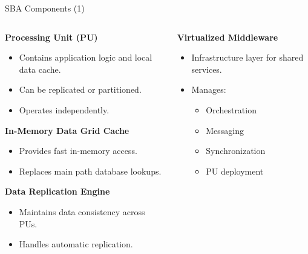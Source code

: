 \documentclass[aspectratio=169, table]{beamer}
\begin{document}
	\begin{frame}{SBA Components (1)}
		\vspace{20pt}
		\begin{columns}[t]
			\begin{column}{0.55\textwidth}
				\textbf{Processing Unit (PU)}
				\begin{itemize}
					\item Contains application logic and local data cache.
					\item Can be replicated or partitioned.
					\item Operates independently.
				\end{itemize}
				
				\textbf{In-Memory Data Grid Cache}
				\begin{itemize}
					\item Provides fast in-memory access.
					\item Replaces main path database lookups.
				\end{itemize}
				
				\textbf{Data Replication Engine}
				\begin{itemize}
					\item Maintains data consistency across PUs.
					\item Handles automatic replication.
				\end{itemize}
			\end{column}
			
			\begin{column}{0.45\textwidth}
				\textbf{Virtualized Middleware}
				\begin{itemize}
					\item Infrastructure layer for shared services.
					\item Manages:
					\begin{itemize}
						\item Orchestration
						\item Messaging
						\item Synchronization
						\item PU deployment
					\end{itemize}
				\end{itemize}
			\end{column}
		\end{columns}
	\end{frame}
	
\end{document}
